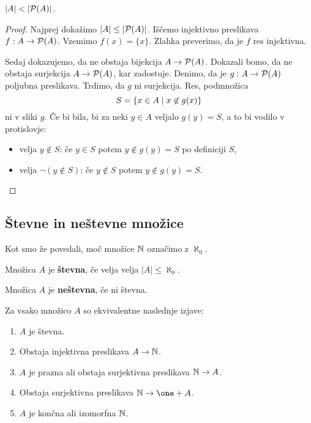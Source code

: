 \begin{izrek}[Cantor]
  $|A| < |\mathcal{P}(A)|$.
\end{izrek}

\begin{proof}
  Najprej dokažimo $|A| \leq |\mathcal{P}(A)|$. Iščemo injektivno preslikava $f : A \to \mathcal{P}(A)$. Vzemimo $f(x) = \{x\}$. Zlahka preverimo, da je $f$ res injektivna.

  Sedaj dokazujemo, da ne obstaja bijekcija $A \to \mathcal{P}(A)$. Dokazali bomo, da ne obstaja surjekcija $A \to \mathcal{P}(A)$, kar zadostuje. Denimo, da je $g : A \to \mathcal{P}(A)$ poljubna preslikava. Trdimo, da $g$ ni surjekcija. Res, podmnožica
  \begin{equation*}
    S = \left\{x \in A \mid x \not\in g(x) \right\}
  \end{equation*}
  ni v sliki $g$. Če bi bila, bi za neki $y \in A$ veljalo $g(y) = S$, a to bi vodilo v protislovje:
  \begin{itemize}
  \item velja $y \not\in S$: če $y \in S$ potem $y \not\in g(y) = S$ po definiciji $S$,
  \item velja $\lnot (y \not\in S)$: če $y \not\in S$ potem $y \not\in g(y) = S$.
  \end{itemize}
\end{proof}


\subsection{Števne in neštevne množice}

Kot smo že povedali, moč množice $\mathbb{N}$ označimo z $\aleph_0$.

\begin{definicija}
  Množica $A$ je \textbf{števna}, če velja velja $|A| \leq \aleph_0$.
\end{definicija}

\begin{definicija}
  Množica $A$ je \textbf{neštevna}, če ni števna.
\end{definicija}

\begin{izrek}
  Za vsako množico $A$ so ekvivalentne naslednje izjave:
  \begin{enumerate}
  \item $A$ je števna.
  \item Obstaja injektivna preslikava $A \to \mathbb{N}$.
  \item $A$ je prazna ali obstaja surjektivna preslikava $\mathbb{N} \to A$.
  \item Obstaja surjektivna preslikava $\NN \to \one + A$.
  \item $A$ je končna ali izomorfna $\mathbb{N}$.
  \end{enumerate}
\end{izrek}

